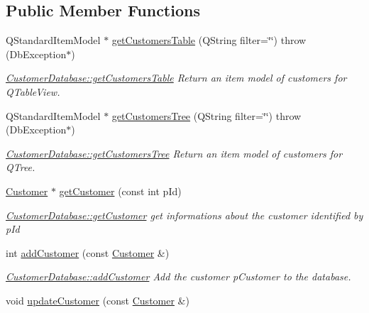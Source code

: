 \subsection*{Public Member Functions}
\begin{DoxyCompactItemize}
\item 
Q\+Standard\+Item\+Model $\ast$ \hyperlink{classCustomerDatabase_a2e25b4f197ccbdd2c5753558dbe18d4b}{get\+Customers\+Table} (Q\+String filter=\char`\"{}\char`\"{})  throw (\+Db\+Exception$\ast$)
\begin{DoxyCompactList}\small\item\em \hyperlink{classCustomerDatabase_a2e25b4f197ccbdd2c5753558dbe18d4b}{Customer\+Database\+::get\+Customers\+Table} Return an item model of customers for Q\+Table\+View. \end{DoxyCompactList}\item 
Q\+Standard\+Item\+Model $\ast$ \hyperlink{classCustomerDatabase_a0fc1ca7fe1020cef19b2423531c4e934}{get\+Customers\+Tree} (Q\+String filter=\char`\"{}\char`\"{})  throw (\+Db\+Exception$\ast$)
\begin{DoxyCompactList}\small\item\em \hyperlink{classCustomerDatabase_a0fc1ca7fe1020cef19b2423531c4e934}{Customer\+Database\+::get\+Customers\+Tree} Return an item model of customers for Q\+Tree. \end{DoxyCompactList}\item 
\hyperlink{classCustomer}{Customer} $\ast$ \hyperlink{classCustomerDatabase_ae510e11ab1efe33b8e1da21bc1ca6f2d}{get\+Customer} (const int p\+Id)
\begin{DoxyCompactList}\small\item\em \hyperlink{classCustomerDatabase_ae510e11ab1efe33b8e1da21bc1ca6f2d}{Customer\+Database\+::get\+Customer} get informations about the customer identified by {\itshape p\+Id} \end{DoxyCompactList}\item 
int \hyperlink{classCustomerDatabase_a522337809fe7588ddc8b5eb27b0cb640}{add\+Customer} (const \hyperlink{classCustomer}{Customer} \&)
\begin{DoxyCompactList}\small\item\em \hyperlink{classCustomerDatabase_a522337809fe7588ddc8b5eb27b0cb640}{Customer\+Database\+::add\+Customer} Add the customer {\itshape p\+Customer} to the database. \end{DoxyCompactList}\item 
\hypertarget{classCustomerDatabase_a2ae17af9bcbf889dec21b4acae3161e1}{void \hyperlink{classCustomerDatabase_a2ae17af9bcbf889dec21b4acae3161e1}{update\+Customer} (const \hyperlink{classCustomer}{Customer} \&)}\label{classCustomerDatabase_a2ae17af9bcbf889dec21b4acae3161e1}


\end{DoxyCompactItemize}
